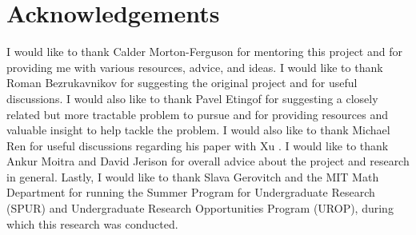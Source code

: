 \documentclass[11pt]{article}
\theoremstyle{definition}
\begin{document}
\section*{Acknowledgements}
I would like to thank Calder Morton-Ferguson for mentoring this project and for providing me with various resources, advice, and ideas. I would like to thank Roman Bezrukavnikov for suggesting the original project and for useful discussions. I would also like to thank Pavel Etingof for suggesting a closely related but more tractable problem to pursue and for providing resources and valuable insight to help tackle the problem. I would also like to thank Michael Ren for useful discussions regarding his paper with Xu \cite{Ren_2020}. I would like to thank Ankur Moitra and David Jerison for overall advice about the project and research in general. Lastly, I would like to thank Slava Gerovitch and the MIT Math Department for running the Summer Program for Undergraduate Research (SPUR) and Undergraduate Research Opportunities Program (UROP), during which this research was conducted.

\printbibliography
\end{document}
